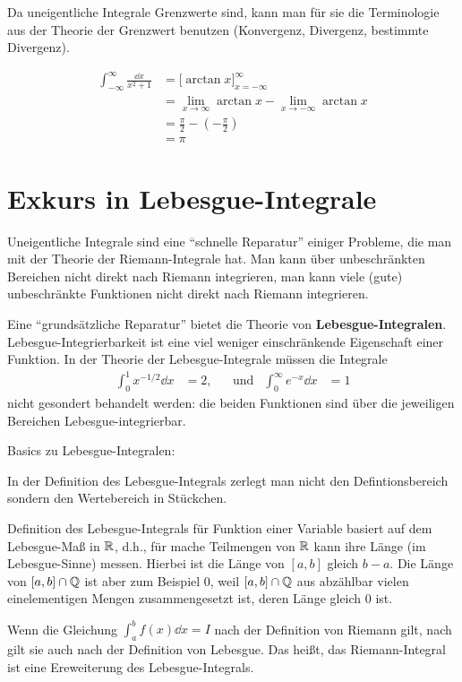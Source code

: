 \begin{bem}
	Da uneigentliche Integrale Grenzwerte sind, kann man für sie die Terminologie aus der Theorie der Grenzwert benutzen (Konvergenz, Divergenz, bestimmte Divergenz). 
\end{bem} 

\begin{bsp} 
	\begin{align*}
		\int_{-\infty}^\infty \frac{\dd x}{x^2 + 1} & = \biggl[ \arctan x \biggr]_{x=-\infty}^\infty 
		\\ & = \lim_{x \to \infty} \arctan x - \lim_{x \to -\infty} \arctan x 
		\\ & = \frac{\pi}{2} - \left( - \frac{\pi}{2} \right) 
		\\ & = \pi 
	\end{align*}
\end{bsp} 

\section{Exkurs in Lebesgue-Integrale}

\begin{bem}
	Uneigentliche Integrale sind eine ``schnelle Reparatur'' einiger Probleme, die man mit der Theorie der Riemann-Integrale hat. Man kann über unbeschränkten Bereichen nicht direkt nach Riemann integrieren, man kann viele (gute) unbeschränkte Funktionen nicht direkt nach Riemann integrieren. 
	
	Eine ``grundsätzliche Reparatur'' bietet die Theorie von \textbf{Lebesgue-Integralen}. Lebesgue-Integrierbarkeit ist eine viel weniger einschränkende Eigenschaft einer Funktion.  In der Theorie der Lebesgue-Integrale müssen die Integrale 
	\begin{align*}
		\int_0^1 x^{-1/2} \dd x & = 2, & &\text{und} & \int_0^\infty e^{-x}  \dd x& = 1
	\end{align*}
	nicht gesondert behandelt werden: die beiden Funktionen sind über die jeweiligen Bereichen Lebesgue-integrierbar. 
\end{bem} 

\begin{bem}
	Basics zu Lebesgue-Integralen:
	\begin{enuma} 
		\item In der Definition des Lebesgue-Integrals zerlegt man nicht den Defintionsbereich sondern den Wertebereich in Stückchen. 
		\item Definition des Lebesgue-Integrals für Funktion einer Variable basiert auf dem Lebesgue-Maß in $\mathbb{R}$, d.h., für mache Teilmengen von $\mathbb{R}$ kann ihre Länge (im Lebesgue-Sinne) messen. Hierbei ist die Länge von $[a,b]$ gleich  $b-a$. Die Länge von $[a,b] \cap \mathbb{Q}$ ist aber zum Beispiel $0$, weil $[a,b] \cap \mathbb{Q}$ aus abzählbar vielen einelementigen Mengen zusammengesetzt ist, deren Länge gleich $0$ ist. 
		\item Wenn die Gleichung $\int_a^b f(x) \dd x = I$ nach der Definition von Riemann gilt, nach gilt sie auch nach der Definition von Lebesgue. Das heißt, das Riemann-Integral ist eine Ereweiterung des Lebesgue-Integrals. 
	\end{enuma} 
\end{bem} 

